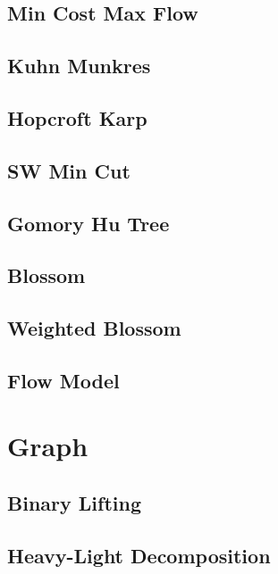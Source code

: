 \subsection{Min Cost Max Flow}

\subsection{Kuhn Munkres}
\subsection{Hopcroft Karp}
\subsection{SW Min Cut}
\subsection{Gomory Hu Tree}
\subsection{Blossom}
\subsection{Weighted Blossom}
\subsection{Flow Model}


\section{Graph}
\subsection{Binary Lifting}

\subsection{Heavy-Light Decomposition}

